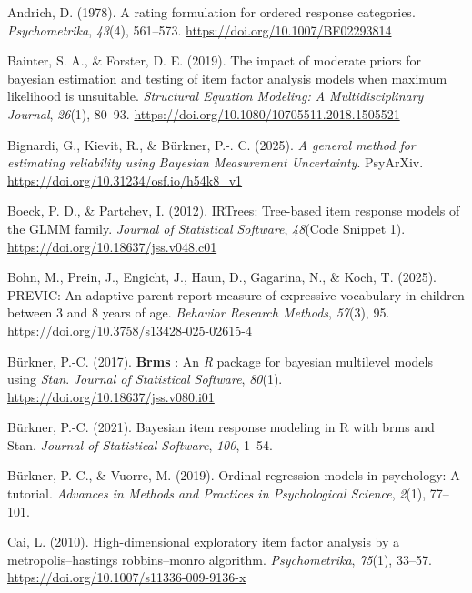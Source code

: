 \documentclass[
  man,
  floatsintext,
  longtable,
  nolmodern,
  notxfonts,
  notimes,
  colorlinks=true,linkcolor=blue,citecolor=blue,urlcolor=blue]{apa7}
\newlength{\cslhangindent}
\newenvironment{CSLReferences}[2] %
 {\begin{list}{}{%
  \setlength{\itemindent}{0pt}
  \setlength{\leftmargin}{0pt}
  \setlength{\parsep}{0pt}
  \ifodd #1
   \setlength{\leftmargin}{\cslhangindent}
   \setlength{\itemindent}{-1\cslhangindent}
  \fi
  \setlength{\itemsep}{#2\baselineskip}}}
 {\end{list}}
\begin{document}
\label{refs}
\begin{CSLReferences}{1}{0}
Andrich, D. (1978). A rating formulation for ordered response
categories. \emph{Psychometrika}, \emph{43}(4), 561--573.
\url{https://doi.org/10.1007/BF02293814}

Bainter, S. A., \& Forster, D. E. (2019). The impact of moderate priors
for bayesian estimation and testing of item factor analysis models when
maximum likelihood is unsuitable. \emph{Structural Equation Modeling: A
Multidisciplinary Journal}, \emph{26}(1), 80--93.
\url{https://doi.org/10.1080/10705511.2018.1505521}

Bignardi, G., Kievit, R., \& Bürkner, P.-. C. (2025). \emph{A general
method for estimating reliability using {Bayesian Measurement
Uncertainty}}. PsyArXiv. \url{https://doi.org/10.31234/osf.io/h54k8_v1}

Boeck, P. D., \& Partchev, I. (2012). {IRTrees}: Tree-based item
response models of the {GLMM} family. \emph{Journal of Statistical
Software}, \emph{48}(Code Snippet 1).
\url{https://doi.org/10.18637/jss.v048.c01}

Bohn, M., Prein, J., Engicht, J., Haun, D., Gagarina, N., \& Koch, T.
(2025). {PREVIC}: {An} adaptive parent report measure of expressive
vocabulary in children between 3 and 8 years of age. \emph{Behavior
Research Methods}, \emph{57}(3), 95.
\url{https://doi.org/10.3758/s13428-025-02615-4}

Bürkner, P.-C. (2017). {\textbf{Brms}} : An {\emph{R}} package for
bayesian multilevel models using {\emph{Stan}}. \emph{Journal of
Statistical Software}, \emph{80}(1).
\url{https://doi.org/10.18637/jss.v080.i01}

Bürkner, P.-C. (2021). Bayesian item response modeling in {R} with brms
and {Stan}. \emph{Journal of Statistical Software}, \emph{100}, 1--54.

Bürkner, P.-C., \& Vuorre, M. (2019). Ordinal regression models in
psychology: {A} tutorial. \emph{Advances in Methods and Practices in
Psychological Science}, \emph{2}(1), 77--101.

Cai, L. (2010). High-dimensional exploratory item factor analysis by a
metropolis--hastings robbins--monro algorithm. \emph{Psychometrika},
\emph{75}(1), 33--57. \url{https://doi.org/10.1007/s11336-009-9136-x}


\end{CSLReferences}
\end{document}

